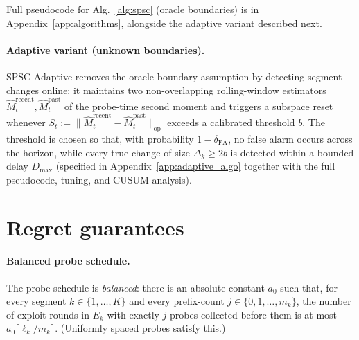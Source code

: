 \documentclass{article}
\newcommand{\op}{\mathrm{op}}
\begin{document}
Full pseudocode for Alg.~\ref{alg:spsc} (oracle boundaries) is in
Appendix~\ref{app:algorithms}, alongside the adaptive variant
described next.

\paragraph{Adaptive variant (unknown boundaries).}
SPSC-Adaptive removes the oracle-boundary assumption by detecting
segment changes online: it maintains two non-overlapping rolling-window
estimators $\widehat M_t^{\mathrm{recent}}, \widehat M_t^{\mathrm{past}}$ of
the probe-time second moment and triggers a subspace reset whenever
$S_t := \|\widehat M_t^{\mathrm{recent}} - \widehat M_t^{\mathrm{past}}\|_\op$
exceeds a calibrated threshold $b$. The threshold is chosen so that,
with probability $1-\delta_{\mathrm{FA}}$, no false alarm occurs across
the horizon, while every true change of size $\Delta_k \ge 2b$ is
detected within a bounded delay $D_{\max}$ (specified in
Appendix~\ref{app:adaptive_algo} together with the full pseudocode,
tuning, and CUSUM analysis).

\section{Regret guarantees}
\label{sec:theory}

\paragraph{Balanced probe schedule.} The probe schedule is
\emph{balanced}: there is an absolute constant $a_0$ such that, for
every segment $k\in\{1,\dots,K\}$ and every prefix-count
$j\in\{0,1,\dots,m_k\}$, the number of exploit rounds in $E_k$ with
exactly $j$ probes collected before them is at most
$a_0\lceil\ell_k/m_k\rceil$. (Uniformly spaced probes satisfy this.)
\end{document}

